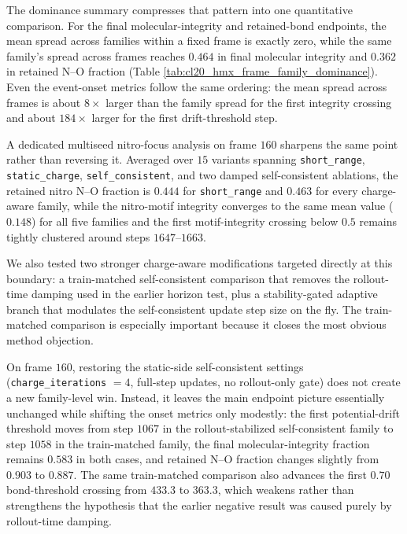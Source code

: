 The dominance summary compresses that pattern into one quantitative comparison. For the final molecular-integrity and retained-bond endpoints, the mean spread across families within a fixed frame is exactly zero, while the same family's spread across frames reaches $0.464$ in final molecular integrity and $0.362$ in retained N--O fraction (Table \ref{tab:cl20_hmx_frame_family_dominance}). Even the event-onset metrics follow the same ordering: the mean spread across frames is about $8\times$ larger than the family spread for the first integrity crossing and about $184\times$ larger for the first drift-threshold step.

A dedicated multiseed nitro-focus analysis on frame $160$ sharpens the same point rather than reversing it. Averaged over $15$ variants spanning \texttt{short\_range}, \texttt{static\_charge}, \texttt{self\_consistent}, and two damped self-consistent ablations, the retained nitro N--O fraction is $0.444$ for \texttt{short\_range} and $0.463$ for every charge-aware family, while the nitro-motif integrity converges to the same mean value ($0.148$) for all five families and the first motif-integrity crossing below $0.5$ remains tightly clustered around steps $1647$--$1663$.

We also tested two stronger charge-aware modifications targeted directly at this boundary: a train-matched self-consistent comparison that removes the rollout-time damping used in the earlier horizon test, plus a stability-gated adaptive branch that modulates the self-consistent update step size on the fly. The train-matched comparison is especially important because it closes the most obvious method objection.

On frame $160$, restoring the static-side self-consistent settings (\texttt{charge\_iterations} $=4$, full-step updates, no rollout-only gate) does not create a new family-level win. Instead, it leaves the main endpoint picture essentially unchanged while shifting the onset metrics only modestly: the first potential-drift threshold moves from step $1067$ in the rollout-stabilized self-consistent family to step $1058$ in the train-matched family, the final molecular-integrity fraction remains $0.583$ in both cases, and retained N--O fraction changes slightly from $0.903$ to $0.887$. The same train-matched comparison also advances the first $0.70$ bond-threshold crossing from $433.3$ to $363.3$, which weakens rather than strengthens the hypothesis that the earlier negative result was caused purely by rollout-time damping.

